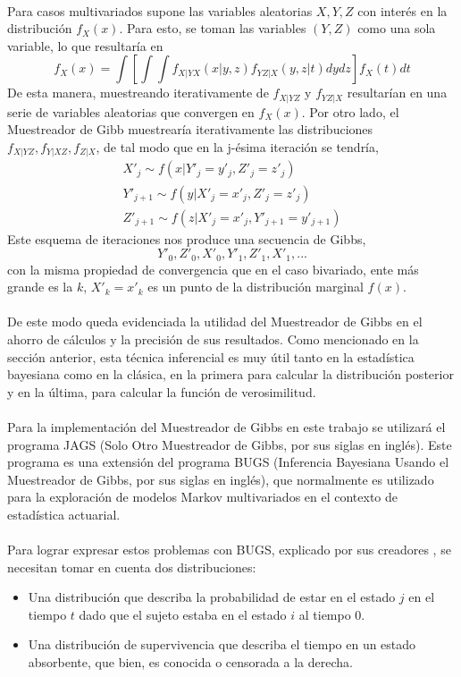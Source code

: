 \\
Para casos multivariados \cite{casella1992explaining} supone las variables aleatorias $X,Y,Z$ con inter\'es en la distribuci\'on $f_X(x)$. Para esto, se toman las variables $(Y,Z)$ como una sola variable, lo que resultar\'ia en\\
\[f_X(x)= \int [ \int \int f_{X|YX}(x|y,z)f_{YZ|X}(y,z|t)dy dz] f_X(t) dt\]
De esta manera, muestreando iterativamente de $f_{X|YZ}$ y $f_{YZ|X}$ resultar\'ian en una serie de variables aleatorias que convergen en $f_X(x)$. Por otro lado, el Muestreador de Gibb muestrear\'ia iterativamente las distribuciones $f_{X|YZ}, f_{Y|XZ}, f_{Z|X}$, de tal modo que en la j-\'esima iteraci\'on se tendr\'ia,\\
\begin{align*}
X'_j \sim f(x|Y'_j = y'_j, Z'_j=z'_j)\\
Y'_{j+1} \sim f(y|X'_j=x'_j, Z'_j=z'_j)\\
Z'_{j+1} \sim f(z|X'_j=x'_j, Y'_{j+1}=y'_{j+1})
\end{align*}
Este esquema de iteraciones nos produce una secuencia de Gibbs,\\
\[Y'_0,Z'_0,X'_0,Y'_1,Z'_1,X'_1,...\]
con la misma propiedad de convergencia que en el caso bivariado, ente m\'as grande es la $k$, $X'_k=x'_k$ es un punto de la distribuci\'on marginal $f(x)$.\\
\\
De este modo queda evidenciada la utilidad del Muestreador de Gibbs en el ahorro de c\'alculos y la precisi\'on de sus resultados. Como mencionado en la secci\'on anterior, esta t\'ecnica inferencial es muy \'util tanto en la estad\'istica bayesiana como en la cl\'asica, en la primera para calcular la distribuci\'on posterior y en la \'ultima, para calcular la funci\'on de verosimilitud.\\
\\
Para la implementaci\'on del Muestreador de Gibbs en este trabajo se utilizar\'a el programa JAGS (Solo Otro Muestreador de Gibbs, por sus siglas en ingl\'es). Este programa es una extensi\'on del programa BUGS (Inferencia Bayesiana Usando el Muestreador de Gibbs, por sus siglas en ingl\'es), que normalmente es utilizado para la exploraci\'on de modelos Markov multivariados en el contexto de estad\'istica actuarial.\\
\\
Para lograr expresar estos problemas con BUGS, explicado por sus creadores \cite{plummer2003jags}, se necesitan tomar en cuenta dos distribuciones:
\begin{itemize}
\item Una distribuci\'on que describa la probabilidad de estar en el estado $j$ en el tiempo $t$ dado que el sujeto estaba en el estado $i$ al tiempo $0$.
\item Una distribuci\'on de supervivencia que describa el tiempo en un estado absorbente, que bien, es conocida o censorada a la derecha.
\end{itemize}
